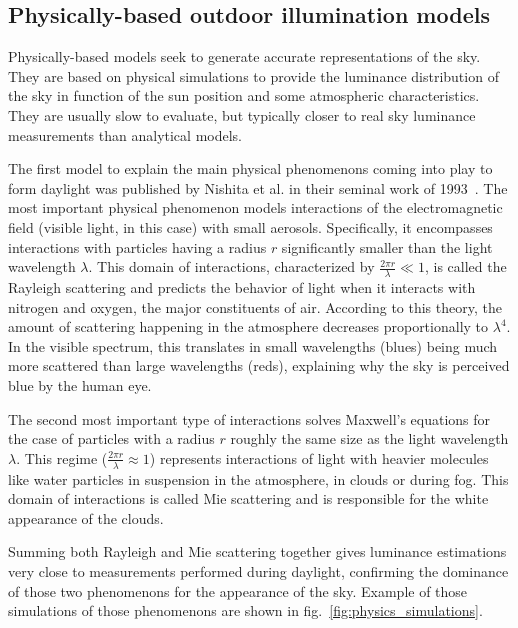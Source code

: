 \subsection{Physically-based outdoor illumination models}

Physically-based models seek to generate accurate representations of the sky. They are based on physical simulations to provide the luminance distribution of the sky in function of the sun position and some atmospheric characteristics. They are usually slow to evaluate, but typically closer to real sky luminance measurements than analytical models.

The first model to explain the main physical phenomenons coming into play to form daylight was published by Nishita et al. in their seminal work of 1993~\cite{nishita1993display}. The most important physical phenomenon models interactions of the electromagnetic field (visible light, in this case) with small aerosols. Specifically, it encompasses interactions with particles having a radius $r$ significantly smaller than the light wavelength $\lambda$. This domain of interactions, characterized by $\frac{2\pi r}{\lambda} \ll 1$, is called the Rayleigh scattering and predicts the behavior of light when it interacts with nitrogen and oxygen, the major constituents of air. According to this theory, the amount of scattering happening in the atmosphere decreases proportionally to $\lambda^4$. In the visible spectrum, this translates in small wavelengths (blues) being much more scattered than large wavelengths (reds), explaining why the sky is perceived blue by the human eye.

The second most important type of interactions solves Maxwell's equations for the case of particles with a radius $r$ roughly the same size as the light wavelength $\lambda$. This regime ($\frac{2\pi r}{\lambda} \approx 1$) represents interactions of light with heavier molecules like water particles in suspension in the atmosphere, in clouds or during fog. This domain of interactions is called Mie scattering and is responsible for the white appearance of the clouds.

Summing both Rayleigh and Mie scattering together gives luminance estimations very close to measurements performed during daylight, confirming the dominance of those two phenomenons for the appearance of the sky. Example of those simulations of those phenomenons are shown in fig.~\ref{fig:physics_simulations}.

